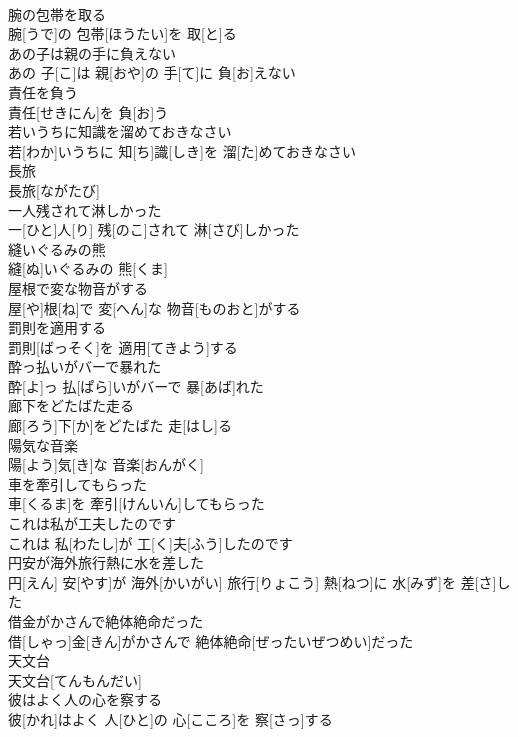 \documentclass[8pt]{extreport}
\begin{document}
\begin{CJK}{UTF8}{min}
\\	腕の包帯を取る	
\\	腕[うで]の 包帯[ほうたい]を 取[と]る
\\	あの子は親の手に負えない	
\\	あの 子[こ]は 親[おや]の 手[て]に 負[お]えない
\\	責任を負う	
\\	責任[せきにん]を 負[お]う
\\	若いうちに知識を溜めておきなさい	
\\	若[わか]いうちに 知[ち]識[しき]を 溜[た]めておきなさい
\\	長旅	
\\	長旅[ながたび]
\\	一人残されて淋しかった	
\\	一[ひと]人[り] 残[のこ]されて 淋[さび]しかった
\\	縫いぐるみの熊	
\\	縫[ぬ]いぐるみの 熊[くま]
\\	屋根で変な物音がする	
\\	屋[や]根[ね]で 変[へん]な 物音[ものおと]がする
\\	罰則を適用する	
\\	罰則[ばっそく]を 適用[てきよう]する
\\	酔っ払いがバーで暴れた	
\\	酔[よ]っ 払[ぱら]いがバーで 暴[あば]れた
\\	廊下をどたばた走る	
\\	廊[ろう]下[か]をどたばた 走[はし]る
\\	陽気な音楽	
\\	陽[よう]気[き]な 音楽[おんがく]
\\	車を牽引してもらった	
\\	車[くるま]を 牽引[けんいん]してもらった
\\	これは私が工夫したのです	
\\	これは 私[わたし]が 工[く]夫[ふう]したのです
\\	円安が海外旅行熱に水を差した	
\\	円[えん] 安[やす]が 海外[かいがい] 旅行[りょこう] 熱[ねつ]に 水[みず]を 差[さ]した
\\	借金がかさんで絶体絶命だった	
\\	借[しゃっ]金[きん]がかさんで 絶体絶命[ぜったいぜつめい]だった
\\	天文台	
\\	天文台[てんもんだい]
\\	彼はよく人の心を察する	
\\	彼[かれ]はよく 人[ひと]の 心[こころ]を 察[さっ]する

\end{CJK}
\end{document}
